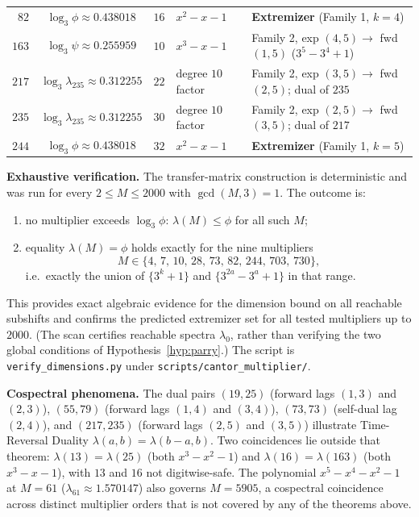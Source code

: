 \documentclass[11pt,reqno]{amsart}
\theoremstyle{plain}
\theoremstyle{definition}
\theoremstyle{remark}
\begin{document}
\begin{table}[htbp]
{\begin{tabular}{rccll}
$82$ & $\log_3 \phi \approx 0.438018$ & $16$  & $x^2 - x - 1$         & \textbf{Extremizer} (Family 1, $k=4$) \\
$163$& $\log_3 \psi \approx 0.255959$ & $10$ & $x^3 - x - 1$            & Family 2, exp $(4,5) \to$ fwd $(1,5)$ ($3^5 - 3^4 + 1$) \\
$217$& $\log_3 \lambda_{235} \approx 0.312255$ & $22$ & degree $10$ factor & Family 2, exp $(3,5) \to$ fwd $(2,5)$; dual of $235$ \\
$235$& $\log_3 \lambda_{235} \approx 0.312255$ & $30$ & degree $10$ factor & Family 2, exp $(2,5) \to$ fwd $(3,5)$; dual of $217$ \\
$244$& $\log_3 \phi \approx 0.438018$ & $32$ & $x^2 - x - 1$        & \textbf{Extremizer} (Family 1, $k=5$) \\
\bottomrule
\end{tabular}%
}
\end{table}

\noindent\textbf{Exhaustive verification.} The transfer-matrix construction is deterministic and was run for every $2 \le M \le 2000$ with $\gcd(M,3)=1$. The outcome is:
\begin{enumerate}
\item no multiplier exceeds $\log_3 \phi$: $\lambda(M) \le \phi$ for all such $M$;
\item equality $\lambda(M) = \phi$ holds exactly for the nine multipliers
\[
M \in \{4,\, 7,\, 10,\, 28,\, 73,\, 82,\, 244,\, 703,\, 730\},
\]
i.e.\ exactly the union of $\{3^k+1\}$ and $\{3^{2a} - 3^a + 1\}$ in that range.
\end{enumerate}
This provides exact algebraic evidence for the dimension bound on all reachable subshifts and confirms the predicted extremizer set for all tested multipliers up to $2000$. (The scan certifies reachable spectra $\lambda_0$, rather than verifying the two global conditions of Hypothesis~\ref{hyp:parry}.) The script is \texttt{verify\_dimensions.py} under \texttt{scripts/cantor\_multiplier/}.

\noindent\textbf{Cospectral phenomena.} The dual pairs $(19, 25)$ (forward lags $(1, 3)$ and $(2, 3)$), $(55, 79)$ (forward lags $(1, 4)$ and $(3, 4)$), $(73, 73)$ (self-dual lag $(2, 4)$), and $(217, 235)$ (forward lags $(2, 5)$ and $(3, 5)$) illustrate Time-Reversal Duality $\lambda(a,b) = \lambda(b-a,b)$. Two coincidences lie outside that theorem: $\lambda(13) = \lambda(25)$ (both $x^3 - x^2 - 1$) and $\lambda(16) = \lambda(163)$ (both $x^3 - x - 1$), with $13$ and $16$ not digitwise-safe. The polynomial $x^5 - x^4 - x^2 - 1$ at $M = 61$ ($\lambda_{61} \approx 1.570147$) also governs $M = 5905$, a cospectral coincidence across distinct multiplier orders that is not covered by any of the theorems above.
\end{document}
